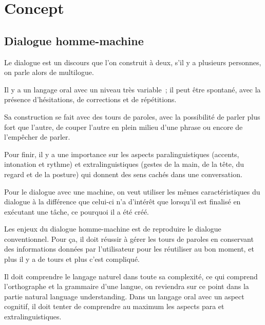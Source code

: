 \graphicspath{{conceptImages/}}
\chapter{Concept}

\section{Dialogue homme-machine}

Le dialogue est un discours que l’on construit à deux, s’il y a plusieurs personnes, on parle alors de multilogue.
\vspace{1em}

	Il y a un langage oral avec un niveau très variable ; il peut être spontané, avec la présence d’hésitations,  de corrections et de répétitions.
	\vspace{1em}
	
	Sa construction se fait avec des tours de paroles, avec la possibilité de parler plus fort que l’autre, de couper l’autre en plein milieu d’une phrase ou encore de l’empêcher de parler.
	\vspace{1em}
	
	Pour finir, il y a une importance sur les aspects paralinguistiques (accents, intonation et rythme) et extralinguistiques (gestes de la main, de la tête, du regard et de la posture) qui donnent des sens cachés dans une conversation.
\vspace{1em}

	Pour le dialogue avec une machine, on veut utiliser les mêmes caractéristiques du dialogue à la différence que celui-ci n’a d’intérêt que lorsqu’il est finalisé en exécutant une tâche, ce pourquoi il a été créé.
	\vspace{1em}
	
	Les enjeux du dialogue homme-machine est de reproduire le dialogue conventionnel. Pour ça, il doit réussir à gérer les tours de paroles en conservant des informations données par l’utilisateur pour les réutiliser au bon moment, et plus il y a de tours et plus c’est compliqué.
	\vspace{1em}
	
	Il doit comprendre le langage naturel dans toute sa complexité, ce qui comprend l’orthographe et la grammaire d’une langue, on reviendra sur ce point dans la partie natural language understanding. Dans un langage oral avec un aspect cognitif, il doit tenter de comprendre au maximum les aspects para et extralinguistiques.
	\vspace{1em}
	
